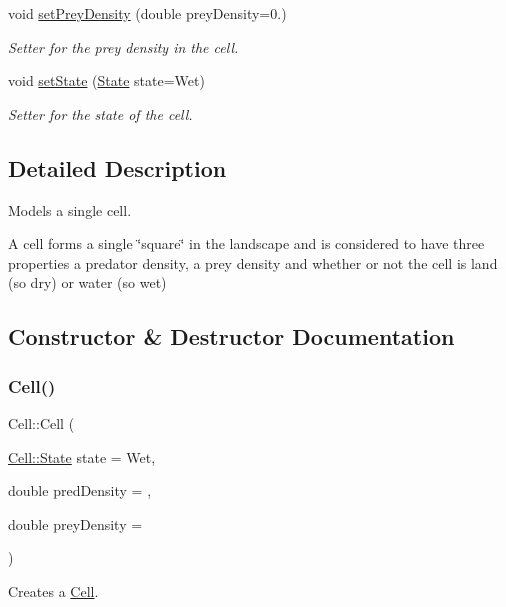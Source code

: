 \begin{DoxyCompactItemize}
void \hyperlink{class_cell_afd3a85027b67dfd4295e2e50253c1058}{set\+Prey\+Density} (double prey\+Density=0.)
\begin{DoxyCompactList}\small\item\em Setter for the prey density in the cell. \end{DoxyCompactList}\item 
void \hyperlink{class_cell_ac388ff95a4d94da1497847ead859f258}{set\+State} (\hyperlink{class_cell_a21d74a2efcb79c93e5649b06a50b7cf5}{State} state=Wet)
\begin{DoxyCompactList}\small\item\em Setter for the state of the cell. \end{DoxyCompactList}\end{DoxyCompactItemize}


\subsection{Detailed Description}
Models a single cell. 

A cell forms a single \char`\"{}square\char`\"{} in the landscape and is considered to have three properties a predator density, a prey density and whether or not the cell is land (so dry) or water (so wet) 

\subsection{Constructor \& Destructor Documentation}
\mbox{\label{class_cell_afc0a4cece64b7689425fa81a4f6ef2e2}} 
\subsubsection{\texorpdfstring{Cell()}{Cell()}}
{\footnotesize\ttfamily Cell\+::\+Cell (\begin{DoxyParamCaption}\item[{\hyperlink{class_cell_a21d74a2efcb79c93e5649b06a50b7cf5}{Cell\+::\+State}}]{state = {\ttfamily Wet},  }\item[{double}]{pred\+Density = {},  }\item[{double}]{prey\+Density = {} }\end{DoxyParamCaption})}



Creates a \hyperlink{class_cell}{Cell}. 

